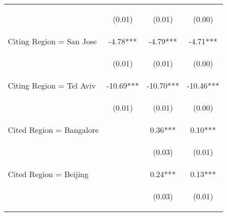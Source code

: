 \begin{center}
\begin{tabular}{lccc}
\vspace{4pt} & \begin{footnotesize}(0.01)\end{footnotesize} & \begin{footnotesize}(0.01)\end{footnotesize} & \begin{footnotesize}(0.00)\end{footnotesize} \\
Citing Region = San Jose & -4.78*** & -4.79*** & -4.71*** \\
\vspace{4pt} & \begin{footnotesize}(0.01)\end{footnotesize} & \begin{footnotesize}(0.01)\end{footnotesize} & \begin{footnotesize}(0.00)\end{footnotesize} \\
Citing Region = Tel Aviv & -10.69*** & -10.70*** & -10.46*** \\
\vspace{4pt} & \begin{footnotesize}(0.01)\end{footnotesize} & \begin{footnotesize}(0.01)\end{footnotesize} & \begin{footnotesize}(0.00)\end{footnotesize} \\
Cited Region = Bangalore &  & 0.36*** & 0.10*** \\
\vspace{4pt} & \begin{footnotesize}\end{footnotesize} & \begin{footnotesize}(0.03)\end{footnotesize} & \begin{footnotesize}(0.01)\end{footnotesize} \\
Cited Region = Beijing &  & 0.24*** & 0.13*** \\
\vspace{4pt} & \begin{footnotesize}\end{footnotesize} & \begin{footnotesize}(0.03)\end{footnotesize} & \begin{footnotesize}(0.01)\end{footnotesize} \\

\end{tabular}
\end{center}
